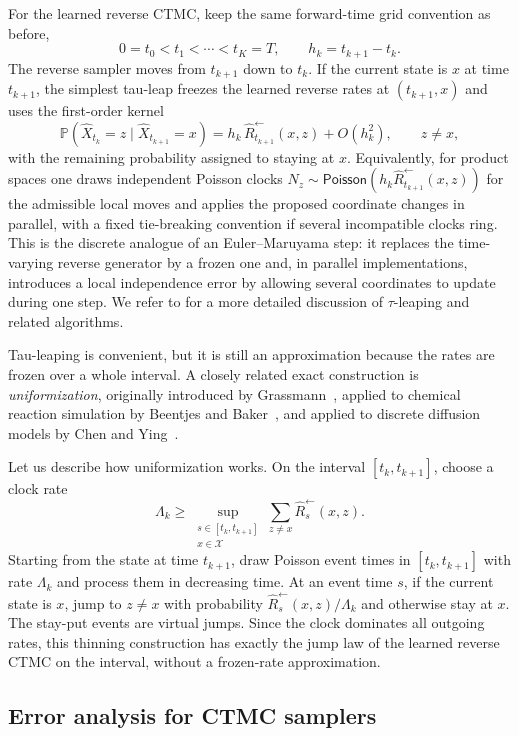 \documentclass{amsart}
\numberwithin{equation}{section}
\theoremstyle{plain}
\theoremstyle{definition}
\theoremstyle{remark}
\newcommand{\Pp}{\mathbb{P}}
\newcommand{\cX}{\mathcal{X}}
\newcommand{\wh}[1]{\widehat{#1}}
\newcommand{\Poi}{\mathsf{Poisson}}
\begin{document}
For the learned reverse CTMC, keep the same forward-time grid convention as
before,
\[
    0=t_0<t_1<\cdots<t_K=T,
    \qquad h_k=t_{k+1}-t_k.
\]
The reverse sampler moves from $t_{k+1}$ down to $t_k$.  If the current state is
$x$ at time $t_{k+1}$, the simplest tau-leap freezes the learned reverse rates
at $(t_{k+1},x)$ and uses the first-order kernel
\[
    \Pp(\wh X_{t_k}=z\mid \wh X_{t_{k+1}}=x)
    =
    h_k\,\wh R_{t_{k+1}}^{\leftarrow}(x,z)
    +O(h_k^2),
    \qquad z\neq x,
\]
with the remaining probability assigned to staying at $x$.  Equivalently, for
product spaces one draws independent Poisson clocks
$N_z\sim\Poi(h_k\wh R_{t_{k+1}}^{\leftarrow}(x,z))$ for the admissible local
moves and applies the proposed coordinate changes in parallel, with a fixed
tie-breaking convention if several incompatible clocks ring.  This is the
discrete analogue of an Euler--Maruyama step: it replaces the time-varying
reverse generator by a frozen one and, in parallel implementations, introduces
a local independence error by allowing several coordinates to update during one
step.  We refer to \cite[Chapter~13]{e2019appliedstochastic} for a more detailed
discussion of $\tau$-leaping and related algorithms.

Tau-leaping is convenient, but it is still an approximation because the rates
are frozen over a whole interval.  A closely related exact construction is
\emph{uniformization}, originally introduced by
Grassmann~\cite{grassmann1977transient}, applied to chemical reaction
simulation by Beentjes and Baker~\cite{beentjes2019uniformisation}, and applied
to discrete diffusion models by Chen and Ying~\cite{chenying2024discrete}.

Let us describe how uniformization works.  On the interval
$[t_k,t_{k+1}]$, choose a clock rate
\[
    \Lambda_k
    \geq
    \sup_{\substack{s\in[t_k,t_{k+1}]\\ x\in\cX}}
    \sum_{z\neq x}\wh R_s^{\leftarrow}(x,z).
\]
Starting from the state at time $t_{k+1}$, draw Poisson event times in
$[t_k,t_{k+1}]$ with rate $\Lambda_k$ and process them in decreasing time.  At
an event time $s$, if the current state is $x$, jump to $z\neq x$ with
probability $\wh R_s^{\leftarrow}(x,z)/\Lambda_k$ and otherwise stay at $x$.
The stay-put events are virtual jumps.  Since the clock dominates all outgoing
rates, this thinning construction has exactly the jump law of the learned
reverse CTMC on the interval, without a frozen-rate approximation.

\subsection{Error analysis for CTMC samplers}
\label{subsec:ctmc-error-analysis}
\end{document}
